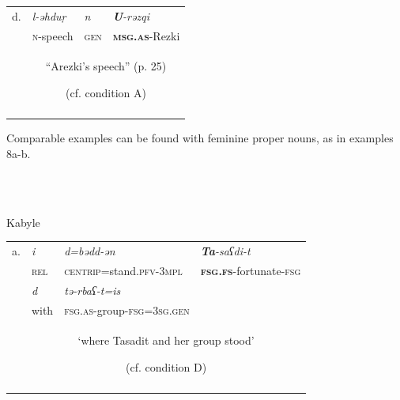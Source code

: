 \documentclass[output=paper]{langscibook}
\begin{document}
\begin{tabularx}{\textwidth}{XXXX}

\lsptoprule
d. & \textit{l-əhduṛ}  & \textit{n} & \textbf{\textit{U}}\textit{{}-rəzqi}\\
& \textsc{n}{}-speech & \textsc{gen} & \textbf{\textsc{msg.as}}{}-Rezki\\
& \multicolumn{3}{c}{“Arezki’s speech” (p. 25)

(cf. condition A)}\\
\lspbottomrule
\end{tabularx}
\begin{styleStandarduser}
Comparable examples can be found with feminine proper nouns, as in examples 8a-b.
\end{styleStandarduser}

\begin{styleStandarduser}
\ea%
    \label{ex:key:8}
    \gll \\
         \\
    \glt
    \z %

          Kabyle \citep[18]{Hamadouche2007}
\end{styleStandarduser}


\begin{tabularx}{\textwidth}{XXXX}

\lsptoprule
a. & \textit{i} & \textit{d=bədd-ən} & \textbf{\textit{Ta}}\textit{{}-saʕdi-t}\\
& \textsc{rel} & \textsc{centrip}=stand.\textsc{pfv-3mpl} & \textbf{\textsc{fsg.fs}}{}-fortunate-\textsc{fsg}\\
& \textit{d} & \textit{tə-rbaʕ-t=is} & \\
& with & \textsc{fsg.as}{}-group-\textsc{fsg=3sg.gen} & \\
& \multicolumn{3}{c}{‘where Tasadit and her group stood’

(cf. condition D)}\\
\lspbottomrule
\end{tabularx}
\end{document}
